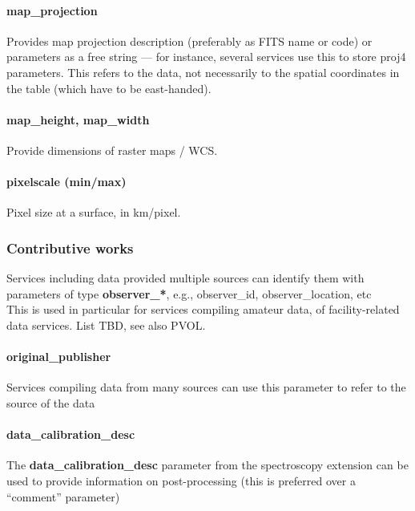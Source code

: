 \documentclass[11pt,a4paper]{ivoa}
\begin{document}
\paragraph{map\_projection}

Provides map projection description (preferably as FITS name or code) or parameters as a free string — for instance, several services use this to store proj4 parameters. This refers to the data, not necessarily to the spatial coordinates in the table (which have to be east-handed).

\paragraph{map\_height, map\_width}

Provide dimensions of raster maps / WCS.

\paragraph{pixelscale (min/max)}

Pixel size at a surface, in km/pixel.

\subsubsection{Contributive works}

Services\textbf{ }including data provided multiple sources can identify them with parameters of type \textbf{observer\_*}, e.g., observer\_id, observer\_location, etc\\This is used in particular for services compiling amateur data, of facility-related data services. List TBD, see also PVOL.

\paragraph{original\_publisher}

Services compiling data from many sources can use this\textbf{ }parameter to refer to the source of the data

\paragraph{data\_calibration\_desc}

The\textbf{ \textbf{data\_calibration\_desc}} parameter from the spectroscopy extension can be used to provide information on post-processing (this is preferred over a ``comment'' parameter)
\end{document}
